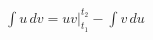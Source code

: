 \documentclass[preview]{standalone}
\begin{document}
\begin{align*}
\int u \, dv = uv \bigg|_{t_1}^{t_2} - \int v \, du
\end{align*}
\end{document}
